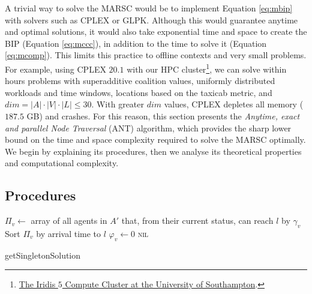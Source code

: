 A trivial way to solve the MARSC would be to implement Equation \ref{eq:mbip} with solvers
such as CPLEX or GLPK. Although this would guarantee anytime and optimal solutions, it
would also take exponential time and space to create the BIP (Equation \ref{eq:mccc}), in
addition to the time to solve it (Equation \ref{eq:mcomp}). This limits this practice to
offline contexts and very small problems. For example, using CPLEX $20.1$ with our HPC
cluster\footnote{\href{https://www.southampton.ac.uk/isolutions/staff/iridis.page}{The
Iridis $5$ Compute Cluster at the University of Southampton}.}, we can solve within hours
problems with superadditive coalition values, uniformly distributed workloads and time
windows, locations based on the taxicab metric, and $dim = |A|\cdot|V|\cdot|L| \leq 30$.
With greater $dim$ values, CPLEX depletes all memory ($187.5$ GB) and crashes. For this
reason, this section presents the \emph{Anytime, exact and parallel Node Traversal} (ANT)
algorithm, which provides the sharp lower bound on the time and space complexity required
to solve the MARSC optimally. We begin by explaining its procedures, then we analyse its
theoretical properties and computational complexity.

\subsection{Procedures}\label{sec:procedures}

\begin{algorithm}[t]
    \DontPrintSemicolon
    $\Pi_v \gets$ array of all agents in $A'$ that, from their current \textsf{status},
    can reach $l$ by $\gamma_v$\;
    Sort $\Pi_v$ by arrival time to $l$\;
    $\varphi_v \gets 0$ 
    \Return \textsc{nil}\;
    \caption{\textsf{getSingletonSolution}\label{algo:getSingletonSolution}}
\end{algorithm}

